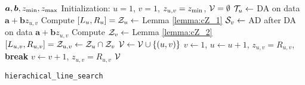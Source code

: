 \begin{algorithm}[!t]
\renewcommand{\algorithmicrequire}{\textbf{Input:}}
\renewcommand{\algorithmicensure}{\textbf{Output:}}
\begin{footnotesize}
 \begin{algorithmic}[1]
  \REQUIRE $\bm a, \bm b, z_{\rm min}, z_{\rm max}$
	\vspace{4pt}
	\STATE Initialization: $u = 1$, $v = 1$, $z_{u, v}  = z_{\rm min}$, ${\mathcal V} = \emptyset$
	\vspace{4pt}
		\vspace{4pt}
		\STATE ${\mathcal T}_u \leftarrow$ DA on data $\bm a + \bm b z_{u, v}$
		\vspace{4pt}
		\STATE Compute $[L_u, R_u] = {\mathcal Z}_u \leftarrow$ Lemma \ref{lemma:cZ_1} 
		\vspace{4pt}
		\vspace{4pt}
		\STATE ${\mathcal S}_v \leftarrow$ AD after DA on data $\bm a + \bm b z_{u, v}$
		\vspace{4pt}
		\STATE Compute ${\mathcal Z}_v \leftarrow$ Lemma \ref{lemma:cZ_2} 
		\vspace{4pt}
		\STATE $[L_{u, v}, R_{u, v}] = {\mathcal Z}_{u, v} \leftarrow {\mathcal Z}_u \cap {\mathcal Z}_v$ 
		\vspace{4pt}
		\vspace{4pt}
		\STATE ${\mathcal V} \leftarrow {\mathcal V} \cup \{ (u, v)\} $
		\vspace{4pt}
		\ENDIF
		\vspace{4pt}
		\vspace{4pt}
		\STATE $v \leftarrow 1$, $u \leftarrow u + 1$, $z_{u, v} = R_{u, v}$, \textbf{break}
		\vspace{4pt}
		\ENDIF
		\vspace{4pt}
		\STATE $v \leftarrow v + 1$, $z_{u, v} = R_{u, v}$
		\vspace{4pt}
		\ENDWHILE	
		\vspace{4pt}
	\ENDWHILE
	\vspace{4pt}
  \ENSURE ${\mathcal V}$ 
 \end{algorithmic}
\end{footnotesize}
\caption{{\tt hierachical\_line\_search}}
\label{alg:hierachical_line_search}
\end{algorithm}



